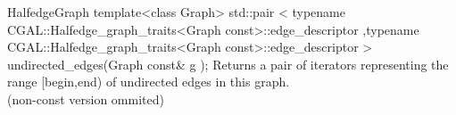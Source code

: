 \begin{ccRefConcept}{HalfedgeGraph}
  \ccFunction
  {template<class Graph>
  std::pair < typename CGAL::Halfedge_graph_traits<Graph const>::edge_descriptor
             ,typename CGAL::Halfedge_graph_traits<Graph const>::edge_descriptor
             >   
  undirected_edges(Graph const& g );
  }
  {Returns a pair of iterators representing the range [begin,end) of undirected edges in this graph.\\
  (non-const version ommited)
  }

\ccHasModels
{}\\
\\

\end{ccRefConcept}

